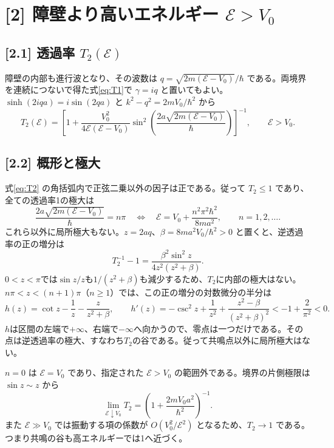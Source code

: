 \documentclass[11pt,a4paper]{article}
\begin{document}
\section*{[2] 障壁より高いエネルギー $\mathcal E>V_0$}
\subsection*{[2.1] 透過率 $T_2(\mathcal E)$}
障壁の内部も進行波となり、その波数は $q=\sqrt{2m(\mathcal E-V_0)}/\hbar$ である。両境界を連続につないで得た式\eqref{eq:T1}で $\gamma=iq$ と置いてもよい。$\sinh(2iqa)=i\sin(2qa)$ と $k^2-q^2=2mV_0/\hbar^2$ から
\begin{equation}
 \boxed{T_2(\mathcal E)=\left[1+
 \frac{V_0^2}{4\mathcal E(\mathcal E-V_0)}
 \sin^2\!\left(\frac{2a\sqrt{2m(\mathcal E-V_0)}}{\hbar}\right)
 \right]^{-1}},\qquad \mathcal E>V_0.\label{eq:T2}
\end{equation}

\subsection*{[2.2] 概形と極大}
式\eqref{eq:T2} の角括弧内で正弦二乗以外の因子は正である。従って $T_2\leq1$ であり、全ての透過率1の極大は
\begin{equation}
 \boxed{\frac{2a\sqrt{2m(\mathcal E-V_0)}}{\hbar}=n\pi
 \quad\Longleftrightarrow\quad
 \mathcal E=V_0+\frac{n^2\pi^2\hbar^2}{8ma^2}},\qquad n=1,2,\ldots.\label{eq:resonance}
\end{equation}
これら以外に局所極大もない。$z=2aq$、$\beta=8ma^2V_0/\hbar^2>0$ と置くと、逆透過率の正の増分は
\begin{equation}
 T_2^{-1}-1=\frac{\beta^2\sin^2z}{4z^2(z^2+\beta)}.
\end{equation}
$0<z<\pi$では$\sin z/z$も$1/(z^2+\beta)$も減少するため、$T_2$に内部の極大はない。$n\pi<z<(n+1)\pi$（$n\ge1$）では、この正の増分の対数微分の半分は
\begin{equation}
 h(z)=\cot z-\frac1z-\frac{z}{z^2+\beta},\qquad
 h'(z)=-\csc^2z+\frac1{z^2}+\frac{z^2-\beta}{(z^2+\beta)^2}
 <-1+\frac2{\pi^2}<0.
\end{equation}
$h$は区間の左端で$+\infty$、右端で$-\infty$へ向かうので、零点は一つだけである。その点は逆透過率の極大、すなわち$T_2$の谷である。従って共鳴点以外に局所極大はない。

$n=0$ は $\mathcal E=V_0$ であり、指定された $\mathcal E>V_0$ の範囲外である。境界の片側極限は $\sin z\sim z$ から
\[
 \lim_{\mathcal E\downarrow V_0}T_2
 =\left(1+\frac{2mV_0a^2}{\hbar^2}\right)^{-1}.
\]
また $\mathcal E\gg V_0$ では振動する項の係数が $O(V_0^2/\mathcal E^2)$ となるため、$T_2\to1$ である。つまり共鳴の谷も高エネルギーでは1へ近づく。
\end{document}

